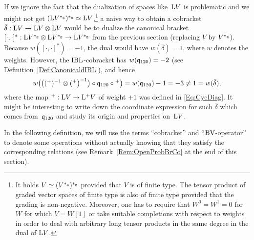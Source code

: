 \documentclass[\MainFolder/Text.tex]{subfiles}
\begin{document}
\begin{Remark}
If we ignore the fact that the dualization of spaces like~$\mathrm{L} V$ is problematic and we might not get $(\mathrm{L} V^{*_{\mathrm{g}}})^{*_{\mathrm{g}}}\simeq \mathrm{L} V$,\footnote{It holds $V\simeq (V^{*_{\mathrm{g}}})^{*_{\mathrm{g}}}$ provided that $V$ is of finite type. The tensor product of graded vector spaces of finite type is also of finite type provided that the grading is non-negative. Moreover, one has to require that $W^0 =W^1=0$ for $W$ for which $V=W[1]$ or take suitable completions with respect to weights in order to deal with arbitrary long tensor products in the same degree in the dual of $\mathrm{L} V$.} a naive way to obtain a cobracket $\bar{\delta}: \mathrm{L} V\rightarrow\mathrm{L} V \otimes\mathrm{L} V$ would be to dualize the  canonical bracket $[\cdot,\cdot]^*: \mathrm{L} V^{*_{\mathrm{g}}} \otimes \mathrm{L} V^{*_{\mathrm{g}}} \rightarrow \mathrm{L} V^{*_{\mathrm{g}}}$ from the previous section (replacing $V$ by $V^{*_{\mathrm{g}}}$). Because $w([\cdot,\cdot]^*) = -1$, the dual would have $w(\bar{\delta}) = 1$, where $w$ denotes the weights. However, the $\mathrm{IBL}$-cobracket has $w(\mathfrak{q}_{120})=-2$ (see Definition~\ref{Def:CanonicaldIBL}), and hence 
\[w\bigl(\bigl(({}^+)^{-1}\otimes({}^+\bigr)^{-1}\bigr)\circ\mathfrak{q}_{120}\circ{}^+\bigr) = w(\mathfrak{q}_{120}) - 1 = - 3 \neq 1 = w(\bar{\delta}), \]
where the map ${}^+: \mathrm{L} V\rightarrow\mathrm{L}^+ V$ of weight $+1$ was defined in \eqref{Eq:CycDiag}. It might be interesting to write down the coordinate expression for such $\bar{\delta}$ which comes from~$\mathfrak{q}_{120}$ and study its origin and properties on~$\mathrm{L} V$.
\end{Remark}

In the following definition, we will use the terms ``cobracket'' and ``$\mathrm{BV}$-operator'' to denote some operations without actually knowing that they satisfy the corresponding relations (see Remark~\ref{Rem:OpenProbBrCo} at the end of this section).
 
\end{document}

